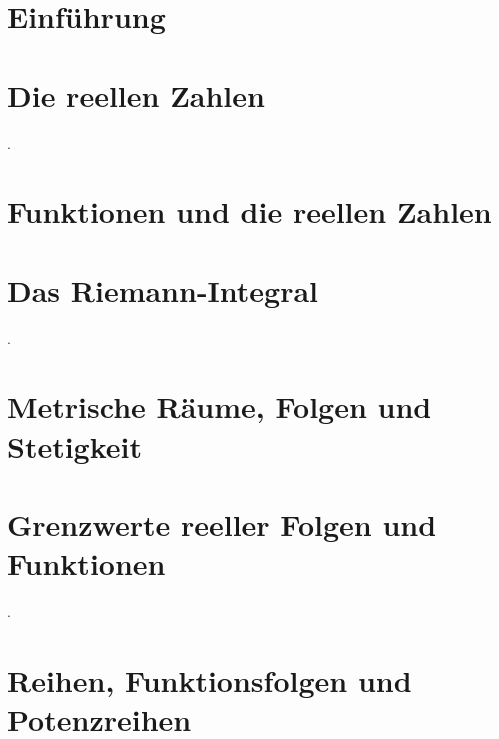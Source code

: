\documentclass[11pt]{report}
\begin{document}
	  

  

  \chapter{Einführung}
  
  

  \chapter{Die reellen Zahlen}
	.
	
	\chapter{Funktionen und die reellen Zahlen}
	
  \chapter{Das Riemann-Integral}
	.
	
  \chapter{Metrische Räume, Folgen und Stetigkeit}
	
	
	
	
  \chapter{Grenzwerte reeller Folgen und Funktionen}
 	.
 	
	
  \chapter{Reihen, Funktionsfolgen und Potenzreihen}
  
  
	
	
\end{document}
